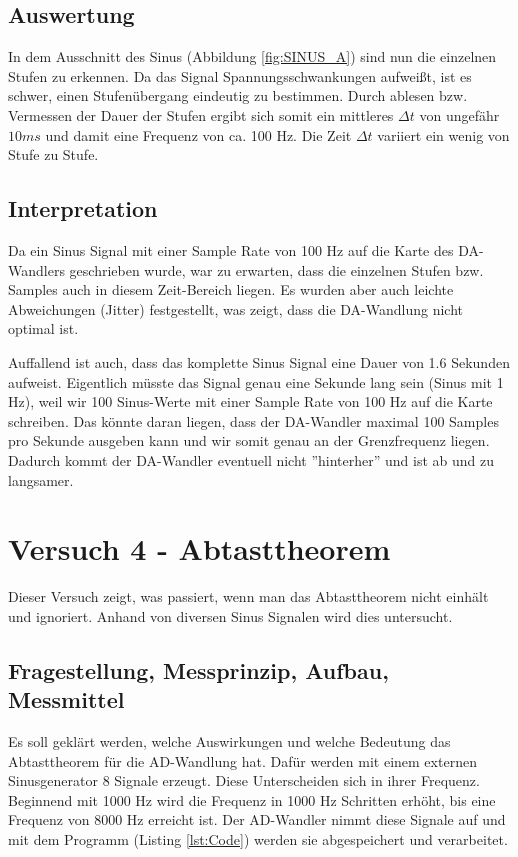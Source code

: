 \documentclass[12pt,oneside,a4paper]{report}
\begin{document}
\section{Auswertung}
\label{chap:VERSUCH_3_AUSWERTUNG}
In dem Ausschnitt des Sinus (Abbildung \ref{fig:SINUS_A}) sind nun die einzelnen Stufen zu erkennen. Da das Signal Spannungsschwankungen aufweißt, ist es schwer, einen Stufenübergang eindeutig zu bestimmen. Durch ablesen bzw. Vermessen der Dauer der Stufen ergibt sich somit ein mittleres $\Delta t$ von ungefähr $10ms$ und damit eine Frequenz von ca. 100 Hz.
Die Zeit $\Delta t$ variiert ein wenig von Stufe zu Stufe.

\section{Interpretation}
\label{chap:VERSUCH_3_INTERPRETATION}
Da ein Sinus Signal mit einer Sample Rate von 100 Hz auf die Karte des DA-Wandlers geschrieben wurde, war zu erwarten, dass die einzelnen Stufen bzw. Samples auch in diesem Zeit-Bereich liegen.
Es wurden aber auch leichte Abweichungen (Jitter) festgestellt, was zeigt, dass die DA-Wandlung nicht optimal ist.

Auffallend ist auch, dass das komplette Sinus Signal eine Dauer von 1.6 Sekunden aufweist.
Eigentlich müsste das Signal genau eine Sekunde lang sein (Sinus mit 1 Hz), weil wir 100 Sinus-Werte mit einer Sample Rate von 100 Hz auf die Karte schreiben.
Das könnte daran liegen, dass der DA-Wandler maximal 100 Samples pro Sekunde ausgeben kann und wir somit genau an der Grenzfrequenz liegen. Dadurch kommt der DA-Wandler eventuell nicht ''hinterher'' und ist ab und zu langsamer.

%
%
\chapter{Versuch 4 - Abtasttheorem}
\label{chap:VERSUCH_4}

Dieser Versuch zeigt, was passiert, wenn man das Abtasttheorem nicht einhält und ignoriert.
Anhand von diversen Sinus Signalen wird dies untersucht.

\section{Fragestellung, Messprinzip, Aufbau, Messmittel}
\label{chap:VERSUCH_4_FRAGESTELLUNG}

Es soll geklärt werden, welche Auswirkungen und welche Bedeutung das Abtasttheorem für die AD-Wandlung hat.
Dafür werden mit einem externen Sinusgenerator 8 Signale erzeugt.
Diese Unterscheiden sich in ihrer Frequenz. Beginnend mit 1000 Hz wird die Frequenz in 1000 Hz Schritten erhöht, bis eine Frequenz von 8000 Hz erreicht ist.
Der AD-Wandler nimmt diese Signale auf und mit dem Programm (Listing \ref{lst:Code}) werden sie abgespeichert und verarbeitet.
\end{document}
